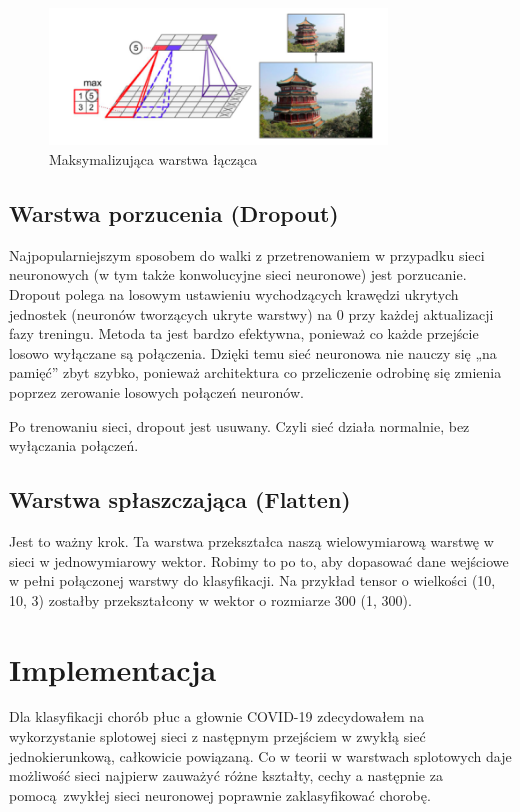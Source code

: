 \documentclass{article}
\begin{document}
\begin{figure}[H]
	\centering
	\includegraphics[width=0.8\textwidth,keepaspectratio=true]{max_pooling}
	\caption{Maksymalizująca warstwa łącząca \cite{geron}}
	\label{max_pooling}
\end{figure}


\subsection{Warstwa porzucenia (Dropout)}
Najpopularniejszym sposobem do walki z przetrenowaniem w przypadku sieci neuronowych (w tym także konwolucyjne sieci neuronowe) jest porzucanie. Dropout polega na losowym ustawieniu wychodzących krawędzi ukrytych jednostek (neuronów tworzących ukryte warstwy) na 0 przy każdej aktualizacji fazy treningu. Metoda ta jest bardzo efektywna, ponieważ co każde przejście losowo wyłączane są połączenia. Dzięki temu sieć neuronowa nie nauczy się „na pamięć” zbyt szybko, ponieważ architektura co przeliczenie odrobinę się zmienia poprzez zerowanie losowych połączeń neuronów. \cite{jak_dziawaja_cnn}

Po trenowaniu sieci, dropout jest usuwany. Czyli sieć działa normalnie, bez wyłączania połączeń.


\subsection{Warstwa spłaszczająca (Flatten)}
Jest to ważny krok. Ta warstwa przekształca naszą wielowymiarową warstwę w sieci w jednowymiarowy wektor. Robimy to po to, aby dopasować dane wejściowe w pełni połączonej warstwy do klasyfikacji. Na przykład tensor o wielkości (10, 10, 3) zostałby przekształcony w wektor o rozmiarze 300 (1, 300). \cite{jak_dziawaja_cnn}

\section{Implementacja}
Dla klasyfikacji chorób płuc a głownie COVID-19 zdecydowałem na wykorzystanie splotowej sieci z następnym przejściem w zwykłą sieć jednokierunkową, całkowicie powiązaną. Co w teorii w warstwach splotowych daje możliwość sieci najpierw zauważyć różne kształty, cechy a następnie za pomocą zwykłej sieci neuronowej poprawnie zaklasyfikować chorobę.
\end{document}
